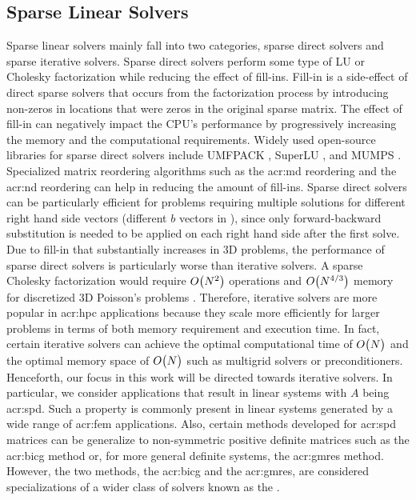 \subsection{Sparse Linear Solvers}

Sparse linear solvers mainly fall into two categories, sparse direct solvers and sparse iterative solvers.
Sparse direct solvers perform some type of LU or Cholesky factorization while reducing the effect of fill-ins.
Fill-in is a side-effect of direct sparse solvers that occurs from the factorization process by introducing non-zeros in locations that were zeros in the original sparse matrix.
The effect of fill-in can negatively impact the CPU's performance by progressively increasing the memory and the computational requirements.
Widely used open-source libraries for sparse direct solvers include UMFPACK \cite{bib:UMFPACKDavis2004,bib:Davis2004CPS}, SuperLU \cite{bib:SuperLU,bib:SuperLUUG}, and MUMPS \cite{bib:MUMPS}.
Specialized matrix reordering algorithms such as the \gls{acr:md} \cite{bib:George1989TEOTMDOA} reordering and the \gls{acr:nd} \cite{bib:George1973NestedDisssection} reordering can help in reducing the amount of fill-ins.
Sparse direct solvers can be particularly efficient for problems requiring multiple solutions for different right hand side vectors (different $b$ vectors in ), since only forward-backward substitution is needed to be applied on each right hand side after the first solve.
Due to fill-in that substantially increases in 3D problems, the performance of sparse direct solvers is particularly worse than iterative solvers.
A sparse Cholesky factorization would require $ O\bigl(N^2\bigr)$ operations and $ O\bigl(N^{4/3}\bigr)$ memory for discretized 3D Poisson's problems \cite[p.~278]{bib:Demmel1997anla}.
Therefore, iterative solvers are more popular in \gls{acr:hpc} applications because they scale more efficiently for larger problems in terms of both memory requirement and execution time.
In fact, certain iterative solvers can achieve the optimal computational time of $ O\bigl(N\bigr)$ and the optimal memory space of $ O\bigl(N\bigr)$ such as multigrid solvers or preconditioners.
Henceforth, our focus in this work will be directed towards iterative solvers.
In particular, we consider applications that result in linear systems with $A$ being \gls{acr:spd}.
Such a property is commonly present in linear systems generated by a wide range of \gls{acr:fem} applications.
Also, certain methods developed for \gls{acr:spd} matrices can be generalize to non-symmetric positive definite matrices such as the \gls{acr:bicg} method or, for more general definite systems, the \gls{acr:gmres} method.
However, the two methods, the \gls{acr:bicg} and the \gls{acr:gmres}, are considered specializations of a wider class of solvers known as the .


